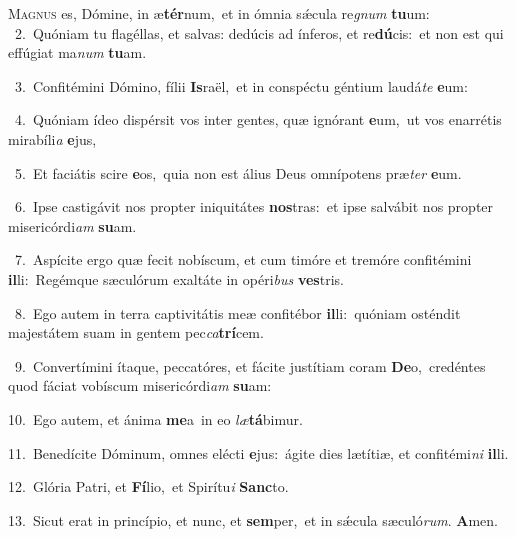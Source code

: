 \lettrine{\initial\textcolor{\initialcolor}{M}}{agnus} es, Dómine, in æ\-\textbf{tér}\-num,~\star et in ómnia sǽcula re\textit{gnum} \textbf{tu}\-um:\\
{\numbfont\textcolor{\numbcolor}{~2.}}~Quóniam tu flagéllas, et salvas: dedúcis ad ínferos, et re\-\textbf{dú}\-cis:~\star et non est qui effúgiat ma\textit{num} \textbf{tu}\-am.\par
{\numbfont\textcolor{\numbcolor}{~3.}}~Confitémini Dómino, fílii \textbf{Is}\-raël,~\star et in conspéctu géntium laudá\textit{te} \textbf{e}\-um:\par
{\numbfont\textcolor{\numbcolor}{~4.}}~Quóniam ídeo dispérsit vos inter gentes, quæ ignórant \textbf{e}\-um,~\star ut vos enarrétis mirabíli\textit{a} \textbf{e}\-jus,\par
{\numbfont\textcolor{\numbcolor}{~5.}}~Et faciátis scire \textbf{e}\-os,~\star quia non est álius Deus omnípotens præ\textit{ter} \textbf{e}\-um.\par
{\numbfont\textcolor{\numbcolor}{~6.}}~Ipse castigávit nos propter iniquitátes \textbf{nos}\-tras:~\star et ipse salvábit nos propter misericórdi\textit{am} \textbf{su}\-am.\par
{\numbfont\textcolor{\numbcolor}{~7.}}~Aspícite ergo quæ fecit nobíscum, et cum timóre et tremóre confitémini \textbf{il}\-li:~\star Regémque sæculórum exaltáte in opéri\textit{bus} \textbf{ves}\-tris.\par
{\numbfont\textcolor{\numbcolor}{~8.}}~Ego autem in terra captivitátis meæ confitébor \textbf{il}\-li:~\star quóniam osténdit majestátem suam in gentem pec\-\textit{ca}\-\textbf{trí}cem.\par
{\numbfont\textcolor{\numbcolor}{~9.}}~Convertímini ítaque, peccatóres, et fácite justítiam coram \textbf{De}\-o,~\star credéntes quod fáciat vobíscum misericórdi\textit{am} \textbf{su}\-am:\par
{\numbfont\textcolor{\numbcolor}{10.}}~Ego autem, et ánima \textbf{me}\-a~\star in eo \textit{læ}\-\textbf{tá}bimur.\par
{\numbfont\textcolor{\numbcolor}{11.}}~Benedícite Dóminum, omnes elécti \textbf{e}\-jus:~\star ágite dies lætítiæ, et confitémi\textit{ni} \textbf{il}\-li.\par
{\numbfont\textcolor{\numbcolor}{12.}}~Glória Patri, et \textbf{Fí}\-lio,~\star et Spirítu\textit{i} \textbf{Sanc}\-to.\par
{\numbfont\textcolor{\numbcolor}{13.}}~Sicut erat in princípio, et nunc, et \textbf{sem}\-per,~\star et in sǽcula sæculó\-\textit{rum}\-. \textbf{A}\-men.\par
